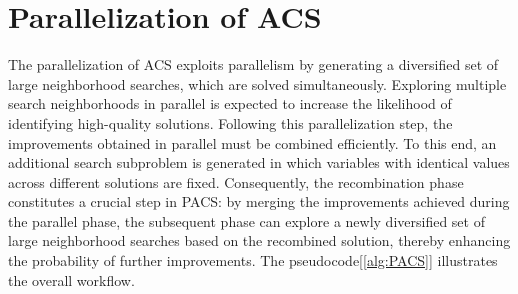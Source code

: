 \section{Parallelization of ACS}
The parallelization of ACS exploits parallelism by generating a diversified set of large neighborhood searches, which are solved simultaneously. Exploring multiple search neighborhoods in parallel is expected to increase the likelihood of identifying high-quality solutions.
Following this parallelization step, the improvements obtained in parallel must be combined efficiently. To this end, an additional search subproblem is generated in which variables with identical values across different solutions are fixed. Consequently, the recombination phase constitutes a crucial step in PACS: by merging the improvements achieved during the parallel phase, the subsequent phase can explore a newly diversified set of large neighborhood searches based on the recombined solution, thereby enhancing the probability of further improvements.
The pseudocode[\ref{alg:PACS}] illustrates the overall workflow.
